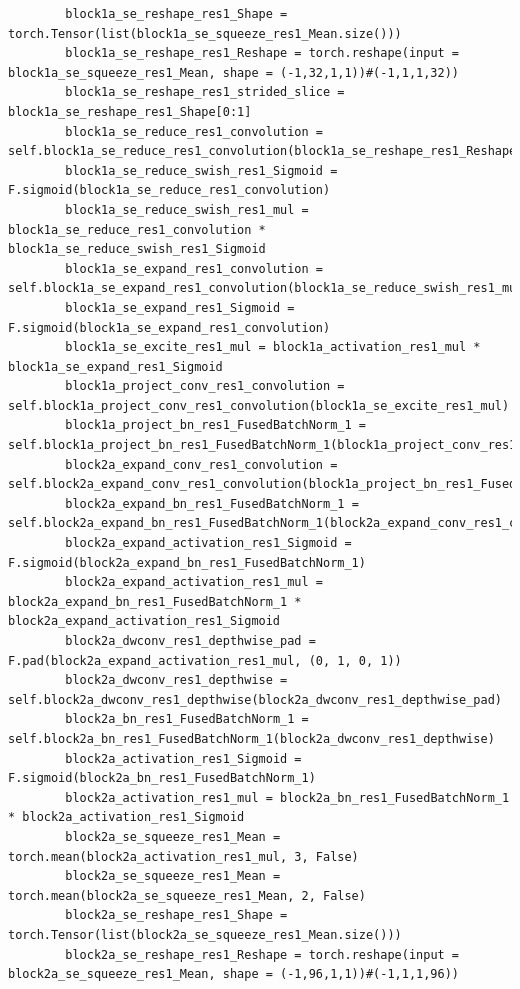 \documentclass{fisatprojectfinal}
\begin{document}
\begin{appendices}
\begin{lstlisting}
        block1a_se_reshape_res1_Shape = torch.Tensor(list(block1a_se_squeeze_res1_Mean.size()))
        block1a_se_reshape_res1_Reshape = torch.reshape(input = block1a_se_squeeze_res1_Mean, shape = (-1,32,1,1))#(-1,1,1,32))
        block1a_se_reshape_res1_strided_slice = block1a_se_reshape_res1_Shape[0:1]
        block1a_se_reduce_res1_convolution = self.block1a_se_reduce_res1_convolution(block1a_se_reshape_res1_Reshape)
        block1a_se_reduce_swish_res1_Sigmoid = F.sigmoid(block1a_se_reduce_res1_convolution)
        block1a_se_reduce_swish_res1_mul = block1a_se_reduce_res1_convolution * block1a_se_reduce_swish_res1_Sigmoid
        block1a_se_expand_res1_convolution = self.block1a_se_expand_res1_convolution(block1a_se_reduce_swish_res1_mul)
        block1a_se_expand_res1_Sigmoid = F.sigmoid(block1a_se_expand_res1_convolution)
        block1a_se_excite_res1_mul = block1a_activation_res1_mul * block1a_se_expand_res1_Sigmoid
        block1a_project_conv_res1_convolution = self.block1a_project_conv_res1_convolution(block1a_se_excite_res1_mul)
        block1a_project_bn_res1_FusedBatchNorm_1 = self.block1a_project_bn_res1_FusedBatchNorm_1(block1a_project_conv_res1_convolution)
        block2a_expand_conv_res1_convolution = self.block2a_expand_conv_res1_convolution(block1a_project_bn_res1_FusedBatchNorm_1)
        block2a_expand_bn_res1_FusedBatchNorm_1 = self.block2a_expand_bn_res1_FusedBatchNorm_1(block2a_expand_conv_res1_convolution)
        block2a_expand_activation_res1_Sigmoid = F.sigmoid(block2a_expand_bn_res1_FusedBatchNorm_1)
        block2a_expand_activation_res1_mul = block2a_expand_bn_res1_FusedBatchNorm_1 * block2a_expand_activation_res1_Sigmoid
        block2a_dwconv_res1_depthwise_pad = F.pad(block2a_expand_activation_res1_mul, (0, 1, 0, 1))
        block2a_dwconv_res1_depthwise = self.block2a_dwconv_res1_depthwise(block2a_dwconv_res1_depthwise_pad)
        block2a_bn_res1_FusedBatchNorm_1 = self.block2a_bn_res1_FusedBatchNorm_1(block2a_dwconv_res1_depthwise)
        block2a_activation_res1_Sigmoid = F.sigmoid(block2a_bn_res1_FusedBatchNorm_1)
        block2a_activation_res1_mul = block2a_bn_res1_FusedBatchNorm_1 * block2a_activation_res1_Sigmoid
        block2a_se_squeeze_res1_Mean = torch.mean(block2a_activation_res1_mul, 3, False)
        block2a_se_squeeze_res1_Mean = torch.mean(block2a_se_squeeze_res1_Mean, 2, False)
        block2a_se_reshape_res1_Shape = torch.Tensor(list(block2a_se_squeeze_res1_Mean.size()))
        block2a_se_reshape_res1_Reshape = torch.reshape(input = block2a_se_squeeze_res1_Mean, shape = (-1,96,1,1))#(-1,1,1,96))

\end{lstlisting}
\end{appendices}
\end{document}
